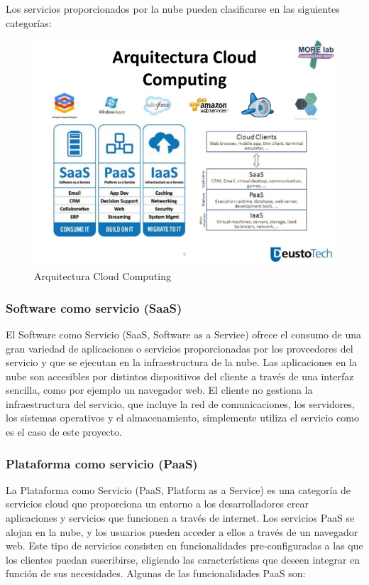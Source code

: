 \documentclass[a4paper,11pt]{book}
\begin{document}
Los servicios proporcionados por la nube pueden clasificarse en las siguientes categorías:

\begin{figure}[H]
\centering
\includegraphics[scale=0.5]{imagenes/arquitecturaCC.jpg}
\caption{ Arquitectura Cloud Computing\cite{arquitecturaCC} }
\end{figure}

\subsubsection{Software como servicio (SaaS)}\label{secsaas}

El Software como Servicio\cite{saas} (SaaS, Software as a Service) ofrece el consumo de una gran variedad de aplicaciones o servicios proporcionadas por los proveedores del servicio y que se ejecutan en la infraestructura de la nube. Las aplicaciones en la nube son accesibles por distintos dispositivos del cliente a través de una interfaz sencilla, como por ejemplo un navegador web. El cliente no gestiona la infraestructura del servicio, que incluye la red de comunicaciones, los servidores, los sistemas operativos y el almacenamiento, simplemente utiliza el servicio como es el caso de este proyecto.

\subsubsection{Plataforma como servicio (PaaS)}\label{secpaas}

La Plataforma como Servicio\cite{paas} (PaaS, Platform as a Service) es una categoría de servicios cloud que proporciona un entorno a los desarrolladores crear aplicaciones y servicios que funcionen a través de internet. Los servicios PaaS se alojan en la nube, y los usuarios pueden acceder a ellos a través de un navegador web. Este tipo de servicios consisten en funcionalidades pre-configuradas a las que los clientes puedan suscribirse, eligiendo las características que deseen integrar en función de sus necesidades. Algunas de las funcionalidades PaaS son:
\end{document}
